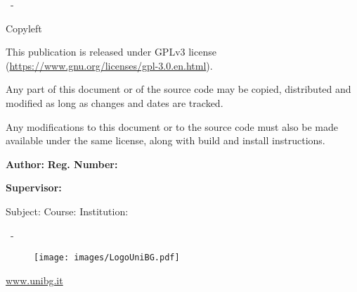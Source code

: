 \colophontitle{\mydocumenttitle}
\colophontitlesize{40pt}
\colophonmidspace{3em}

\vspace{8cm}
\begin{colophon}
	\mydocumentsubtitle
	
	\vspace{1cm}
	\Large
	\hfill \textbf{\myauthor}
	
	\vspace{12cm}
	
	\myplaceofpublishing\ - \mydateofpublishing
\end{colophon}

\newpage \thispagestyle{empty}
\noindent Copyleft\ \textcopyleft\ \myyearofpublishing\ \myauthor

\hfill\break This publication is released under GPLv3 license (\url{https://www.gnu.org/licenses/gpl-3.0.en.html}).

\noindent Any part of this document or of the source code may be copied, distributed and modified as long as changes and dates are tracked.

\noindent Any modifications to this document or to the source code must also be made available under the same license, along with build and install instructions.

\vspace{3cm}

\hfill\break \textbf{Author: } \myauthor
\hfill\break \textbf{Reg. Number: } \myauthorregnumber

\hfill\break \textbf{Supervisor: } \mysupervisor

\hfill\break Subject: \mydocumentsubject
\hfill\break Course: \mycourse
\hfill\break Institution: \myinstitution

\vspace{3cm}

\hfill\break%
\mydateofpublishing
\hfill\break%
\myinstitution\ - \myinstitutiondepartment
\begin{figure}[H]%
	\texttt{[image: images/LogoUniBG.pdf]}%
	\label{fig:LogoUniBG}
\end{figure}%
\noindent \myinstitutionaddress
\hfill\break \url{www.unibg.it}